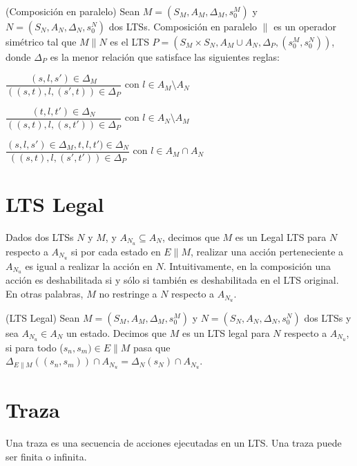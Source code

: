 \begin{definition}{(Composición en paralelo)}
Sean $M = (S_{M}, A_{M}, \Delta_{M}, s_{0}^{M})$ y\\
$N = (S_{N}, A_{N}, \Delta_{N}, s_{0}^{N})$ dos LTSs. Composición en paralelo $\parallel$ es un operador simétrico tal que 
$M \parallel N$ es el LTS $P = (S_{M} \times S_{N}, A_{M} \cup A_{N}, \Delta_{P}, (s_{0}^{M}, s_{0}^{N}))$, donde $\Delta_{P}$ es 
la menor relación que satisface las siguientes reglas:

\vspace{\baselineskip}
$\dfrac{(s, l, s') \in \Delta_{M}}{((s, t), l, (s', t)) \in \Delta_{P}}$ con $l \in A_{M} \setminus A_{N}$

\vspace{\baselineskip}
$\dfrac{(t, l, t') \in \Delta_{N}}{((s, t), l, (s, t')) \in \Delta_{P}}$ con $l \in A_{N} \setminus A_{M}$

\vspace{\baselineskip}
$\dfrac{(s, l, s') \in \Delta_{M}, t, l, t') \in \Delta_{N}}{((s, t), l, (s', t')) \in \Delta_{P}}$ con $l \in A_{M} \cap A_{N}$
\end{definition}

\section{LTS Legal}
Dados dos LTSs $N$ y $M$, y $A_{N_{u}} \subseteq A_{N}$, decimos que $M$ es un Legal LTS para $N$ respecto a $A_{N_{u}}$ si por cada 
estado en $E\parallel$$M$, realizar una acción perteneciente a $A_{N_{u}}$ es igual a realizar la acción en $N$. 
Intuitivamente, en la composición una acción es deshabilitada si y sólo si también es deshabilitada en el LTS original. 
En otras palabras, $M$ no restringe a $N$ respecto a $A_{N_{u}}$.

\begin{definition}{(LTS Legal)}
Sean $M = (S_{M}, A_{M}, \Delta_{M}, s_{0}^{M})$ y $N = (S_{N}, A_{N}, \Delta_{N}, s_{0}^{N})$ dos LTSs y sea $A_{N_{u}} \in A_{N}$ un estado. 
Decimos que $M$ es un LTS legal para $N$ respecto a $A_{N_{u}}$, si para todo ($s_{n}, s_{m}) \in E \parallel M$ pasa que 
$\Delta_{E \parallel M}((s_{n}, s_{m})) \cap A_{N_{u}} = \Delta_{N}(s_{N}) \cap A_{N_{u}}$.
\end{definition}

\section{Traza}
Una traza es una secuencia de acciones ejecutadas en un LTS. Una traza puede ser finita o infinita.

